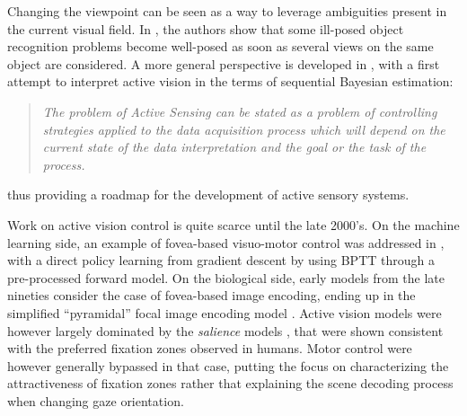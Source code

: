 \documentclass[12pt,twoside,openright]{article}
\begin{document}
Changing the viewpoint can be seen as a way to leverage ambiguities present in the current visual field. In \citet{aloimonos1988active}, the authors show that some ill-posed object recognition problems become well-posed as soon as several views on the  same object are considered. A more general perspective is developed in \citet{bajcsy1988active}, with a first attempt to interpret active vision in the terms of sequential Bayesian estimation:
\begin{quote}
	\emph{The problem  of Active Sensing can be stated as a problem of controlling strategies 
		applied to the data acquisition process which will depend on the current state 
		of the data interpretation and  the  goal  or the  task of  the  process.}
\end{quote}
thus providing a roadmap for the development of active sensory systems.

Work on active vision control is quite scarce until the late 2000's.
On the machine learning side, an example of fovea-based visuo-motor control was  addressed in \citet{schmidhuber1991learning}, with a direct policy learning from gradient descent by using BPTT through a pre-processed forward model. 
On the biological  side, early models from the late nineties  consider the case of fovea-based image encoding, ending up in the simplified ``pyramidal'' focal image encoding model \citep{kortum1996implementation}. Active vision models were however largely dominated by the \emph{salience} models \citep{itti2000saliency, itti2001computational, itti2005bayesian}, that were shown consistent with the preferred fixation zones observed in humans. 
Motor control were however generally bypassed in that case, putting the focus on characterizing the attractiveness of fixation zones rather that explaining 
the scene {\color{magenta}decoding} process when changing gaze orientation.
\end{document}
